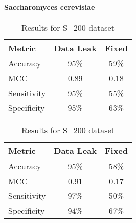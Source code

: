       \paragraph{Saccharomyces cerevisiae}
        \noindent
        \begin{table}[H]
            \centering
            \begin{minipage}{0.45\textwidth}
              \centering
              \begin{tabular}{lcc}
                \toprule
                \textbf{Metric} & \textbf{Data Leak} & \textbf{Fixed} \\
                \midrule
                Accuracy        & 95\%               & 59\%           \\
                MCC             & 0.89               & 0.18           \\
                Sensitivity     & 95\%               & 55\%           \\
                Specificity     & 95\%               & 63\%           \\
                \bottomrule
              \end{tabular}
              \caption{Results for S\_628 dataset}
            \end{minipage}%
            \hfill
            \begin{minipage}{0.45\textwidth}
              \centering
              \begin{tabular}{lcc}
                \toprule
                \textbf{Metric} & \textbf{Data Leak} & \textbf{Fixed} \\
                \midrule
                Accuracy        & 95\%               & 58\%           \\
                MCC             & 0.91               & 0.17           \\
                Sensitivity     & 97\%               & 50\%           \\
                Specificity     & 94\%               & 67\%           \\
                \bottomrule
              \end{tabular}
              \caption{Results for S\_200 dataset}
            \end{minipage}\label{tab:xgb_pstnpss_sc}
        \end{table}

